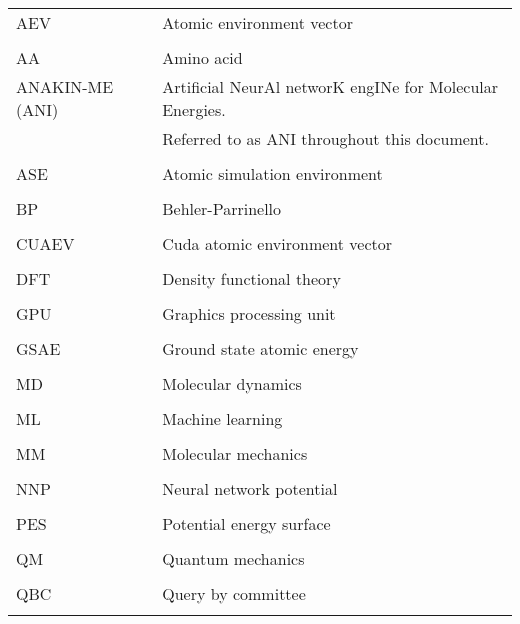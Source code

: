 \singlespacing
\begin{tabular}{l p{5in}} 
AEV & Atomic environment vector\\
\\
AA & Amino acid \\
ANAKIN-ME (ANI) & Artificial NeurAl networK engINe for Molecular Energies.\\
 & Referred to as ANI throughout this document.\\
\\
ASE & Atomic simulation environment\\
\\
BP & Behler-Parrinello\\
\\
CUAEV & Cuda atomic environment vector\\
\\
DFT & Density functional theory\\
\\
GPU & Graphics processing unit\\
\\
GSAE & Ground state atomic energy\\
\\
MD & Molecular dynamics\\
\\
ML & Machine learning\\
\\
MM & Molecular mechanics\\
\\
NNP & Neural network potential\\
\\
PES & Potential energy surface\\
\\
QM & Quantum mechanics\\
\\
QBC & Query by committee\\
\\


\end{tabular}
\doublespacing
